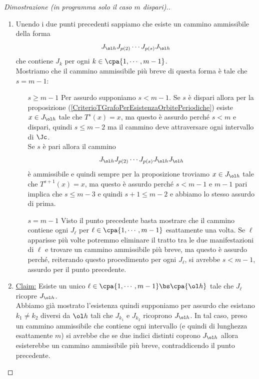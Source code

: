\begin{proof}[Dimostrazione (in programma solo il caso $m$ dispari).]
\begin{enumerate}
Per assurdo supponiamo che non esista un tale $\ol\ell$. 
Notiamo che per ogni $P_j$ con $P_j>P_{\ol h}$ si deve avere che $T(P_j)<P_{\ol h}$\footnote{se $T(P_{\ol h+1})>P_{\ol h}$ allora esiste un minimo $j_0>\ol h+1$ tale che $T(P_{j_0})\leq P_{\ol h}$ e in tal caso $J_{j_0-1}$ ricopre $J_{\ol h}$, assurdo. Reiteriamo proseguendo verso $b$.}
Similmente per $P_j<P_{\ol h}$ ricaviamo iterativamente che $T(P_j)>P_{\ol h}$. 
Abbiamo quindi diviso i punti esattamente a met\`a, ma questo \`e assurdo perch\'e $m$ dispari.
\item Unendo i due punti precedenti sappiamo che esiste un cammino ammissibile della forma
\[J_{\ol h}J_{p(2)}\cdots J_{p(s)}J_{\ol h}\]
che contiene $J_k$ per ogni $k\in\cpa{1,\cdots,m-1}$.\\
Mostriamo che il cammino ammissibile pi\`u breve di questa forma \`e tale che $s=m-1$:
\setlength{\leftmargini}{0cm}
\begin{itemize}
\item[$\boxed{s\geq m-1}$] Per assurdo supponiamo $s<m-1$. Se $s$ \`e dispari allora per la proposizione (\ref{CriterioTGrafoPerEsistenzaOrbitePeriodiche}) esiste $x\in J_{\ol h}$ tale che $T^s(x)=x$, ma questo \`e assurdo perch\'e $s<m$ e dispari, quindi $s\leq m-2$ ma il cammino deve attraversare ogni intervallo di $\Jc$.\\
Se $s$ \`e pari allora il cammino 
\[J_{\ol h}J_{p(2)}\cdots J_{p(s)}J_{\ol h}J_{\ol h}\]
\`e ammissibile e quindi sempre per la proposizione troviamo $x\in J_{\ol h}$ tale che $T^{s+1}(x)=x$, ma questo \`e assurdo perch\'e $s<m-1$ e $m-1$ pari implica che $s\leq m-3$ e quindi $s+1\leq m-2$ e abbiamo lo stesso assurdo di prima.
\item[$\boxed{s=m-1}$] Visto il punto precedente basta mostrare che il cammino contiene ogni $J_{\ell}$ per $\ell\in\cpa{1,\cdots, m-1}$ esattamente una volta. Se $\ell$ apparisse pi\`u volte potremmo eliminare il tratto tra le due manifestazioni di $\ell$ e trovare un cammino ammissibile pi\`u breve, ma questo \`e assurdo perch\'e, reiterando questo procedimento per ogni $J_\ell$, si avrebbe $s<m-1$, assurdo per il punto precedente.
\end{itemize}
\setlength{\leftmargini}{0.5cm}

\item \underline{Claim:} Esiste un unico $\ell\in\cpa{1,\cdots,m-1}\bs\cpa{\ol h}$ tale che $J_\ell$ ricopre $J_{\ol h}$.\\
Abbiamo gi\`a mostrato l'esistenza quindi supponiamo per assurdo che esistano $k_1\neq k_2$ diversi da $\ol h$ tali che $J_{k_1}$ e $J_{k_2}$ ricoprono $J_{\ol h}$. In tal caso, preso un cammino ammissibile che contiene ogni intervallo (e quindi di lunghezza esattamente $m$) si avrebbe che se due indici distinti coprono $J_{\ol h}$ allora esisterebbe un cammino ammissibile pi\`u breve, contraddicendo il punto precedente.


\end{enumerate}
\end{proof}
